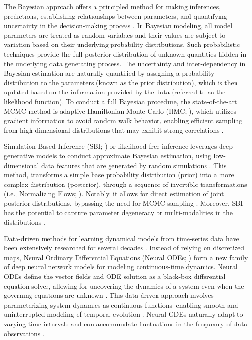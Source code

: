 \documentclass[preprint,11pt,authoryear]{elsarticle}
\begin{document}
The Bayesian approach offers a principled method for making inferences, predictions, establishing relationships between parameters, and quantifying uncertainty in the decision-making process \citep{BDA, Bishop, Gelman2020, VanSchoot2021}. In Bayesian modeling, all model parameters are treated as random variables and their values are subject to variation based on their underlying probability distributions. Such probabilistic techniques provide the full posterior distribution of unknown quantities hidden in the underlying data generating process. The uncertainty and inter-dependency in Bayesian estimation are naturally quantified by assigning a probability distribution to the parameters (known as the prior distribution), which is then updated based on the information provided by the data (referred to as the likelihood function). To conduct a full Bayesian procedure, the state-of-the-art MCMC method is adaptive Hamiltonian Monte Carlo (HMC; \cite{Duane1987, Neal2010, Hoffman2014}), which utilizes gradient information to avoid random walk behavior, enabling efficient sampling from high-dimensional distributions that may exhibit strong correlations \citep{Betancourt2017}.



Simulation-Based Inference (SBI; \cite{Cranmer2020, Brehmer2021}) or likelihood-free inference \citep{Papamakarios2016,  Brehmer2020} leverages deep generative models to conduct approximate Bayesian estimation, using low-dimensional data features that are generated by random simulations \citep{Goncalves2020, Lueckmann2021, Boelts2022}. This method, transforms a simple base probability distribution (prior) into a more complex distribution (posterior), through a sequence of invertible transformations (i.e., Normalizing Flows; \cite{Rezende2015, Papamakarios2019}). Notably, it allows for direct estimation of joint posterior distributions, bypassing the need for MCMC sampling \citep{Greenberg2019, Papamakarios2019b}. Moreover, SBI has the potential to capture parameter degeneracy or multi-modalities in the distributions \citep{Hashemi2023}.


Data-driven methods for learning dynamical models from time-series data have been extensively researched for several decades \citep{Juang1994, Ljung1998, Brunton2016, Linderman2017, Duncker2019, Koppe2019, Sip2023}.
Instead of relying on discretized maps, Neural Ordinary Differential Equations (Neural ODEs; \cite{Chen2018}) form a new family of deep neural network models for modeling continuous-time dynamics. Neural ODEs define the vector fields and ODE solution as a black-box differential equation solver, allowing for uncovering the dynamics of a system even when the governing equations are unknown \citep{Dupont2019, Bilovs2021}. This data-driven approach involves parameterizing system dynamics as continuous functions, enabling smooth and uninterrupted modeling of temporal evolution \citep{Yan2019, Kim2021}. Neural ODEs naturally adapt to varying time intervals and can accommodate fluctuations in the frequency of data observations \citep{Zhu2022, Goyal2023}.
\end{document}
